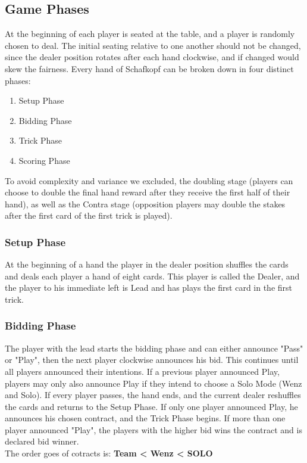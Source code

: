 \subsection{Game Phases}\label{gamephases}
At the beginning of each player is seated at the table, and a player is randomly chosen to deal.
The initial seating relative to one another should not be changed, since the dealer position rotates after each hand
clockwise, and if changed would skew the fairness.
\newline
Every hand of Schafkopf can be broken down in four distinct phases:
\begin{enumerate}
    \item Setup Phase
    \item Bidding Phase
    \item Trick Phase
    \item Scoring Phase
\end{enumerate}
To avoid complexity and variance we excluded, the doubling stage (players can choose to double the final hand reward
after they receive the first half of their hand), as well as the Contra stage (opposition players may double the
stakes after the first card of the first trick is played).

\subsubsection{Setup Phase}
At the beginning of a hand the player in the dealer position shuffles the cards and deals each player a hand of eight
cards.
This player is called the Dealer, and the player to his immediate left is Lead and has plays the first card in the
first trick.

\subsubsection{Bidding Phase}
The player with the lead starts the bidding phase and can either announce "Pass" or "Play", then the next player
clockwise announces his bid.
This continues until all players announced their intentions.
If a previous player announced Play, players may only also announce Play if they intend to choose a Solo Mode (Wenz
and Solo).
If every player passes, the hand ends, and the current dealer reshuffles the cards and returns to the Setup Phase.
If only one player announced Play, he announces his chosen contract, and the Trick Phase begins.
If more than one player announced "Play", the players with the higher bid wins the contract and is declared bid
winner.\\
The order goes of cotracts is: \textbf{Team < Wenz < SOLO}

